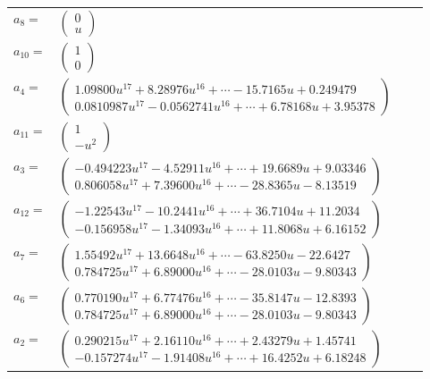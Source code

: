 \documentclass[1p]{elsarticle_modified}
\theoremstyle{definition}
\begin{document}
\begin{tabular}{m{7pt} m{180pt} m{7pt} m{180pt} }
\flushright $a_{8}=$&$\begin{pmatrix}0\\u\end{pmatrix}$ \\
\flushright $a_{10}=$&$\begin{pmatrix}1\\0\end{pmatrix}$ \\
\flushright $a_{4}=$&$\begin{pmatrix}1.09800 u^{17}+8.28976 u^{16}+\cdots-15.7165 u+0.249479\\0.0810987 u^{17}-0.0562741 u^{16}+\cdots+6.78168 u+3.95378\end{pmatrix}$ \\
\flushright $a_{11}=$&$\begin{pmatrix}1\\- u^2\end{pmatrix}$ \\
\flushright $a_{3}=$&$\begin{pmatrix}-0.494223 u^{17}-4.52911 u^{16}+\cdots+19.6689 u+9.03346\\0.806058 u^{17}+7.39600 u^{16}+\cdots-28.8365 u-8.13519\end{pmatrix}$ \\
\flushright $a_{12}=$&$\begin{pmatrix}-1.22543 u^{17}-10.2441 u^{16}+\cdots+36.7104 u+11.2034\\-0.156958 u^{17}-1.34093 u^{16}+\cdots+11.8068 u+6.16152\end{pmatrix}$ \\
\flushright $a_{7}=$&$\begin{pmatrix}1.55492 u^{17}+13.6648 u^{16}+\cdots-63.8250 u-22.6427\\0.784725 u^{17}+6.89000 u^{16}+\cdots-28.0103 u-9.80343\end{pmatrix}$ \\
\flushright $a_{6}=$&$\begin{pmatrix}0.770190 u^{17}+6.77476 u^{16}+\cdots-35.8147 u-12.8393\\0.784725 u^{17}+6.89000 u^{16}+\cdots-28.0103 u-9.80343\end{pmatrix}$ \\
\flushright $a_{2}=$&$\begin{pmatrix}0.290215 u^{17}+2.16110 u^{16}+\cdots+2.43279 u+1.45741\\-0.157274 u^{17}-1.91408 u^{16}+\cdots+16.4252 u+6.18248\end{pmatrix}$ \\

\end{tabular}
\end{document}
